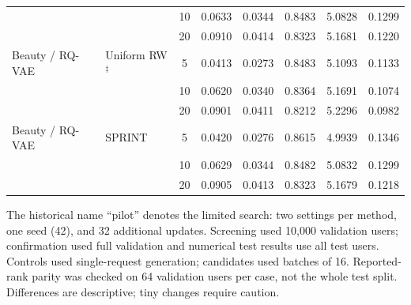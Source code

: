 \begin{table}[p]
\begin{tabular}{llcccccc}
 &  & 10 & 0.0633 & 0.0344 & 0.8483 & 5.0828 & 0.1299 \\
 &  & 20 & 0.0910 & 0.0414 & 0.8323 & 5.1681 & 0.1220 \\
Beauty / RQ-VAE & Uniform RW$^{\ddagger}$ & 5 & 0.0413 & 0.0273 & 0.8483 & 5.1093 & 0.1133 \\
 &  & 10 & 0.0620 & 0.0340 & 0.8364 & 5.1691 & 0.1074 \\
 &  & 20 & 0.0901 & 0.0411 & 0.8212 & 5.2296 & 0.0982 \\
Beauty / RQ-VAE & SPRINT & 5 & 0.0420 & 0.0276 & 0.8615 & 4.9939 & 0.1346 \\
 &  & 10 & 0.0629 & 0.0344 & 0.8482 & 5.0832 & 0.1299 \\
 &  & 20 & 0.0905 & 0.0413 & 0.8323 & 5.1679 & 0.1218 \\
\bottomrule
\end{tabular}
\par\smallskip\footnotesize The historical name ``pilot'' denotes the limited search: two settings per method, one seed (42), and 32 additional updates. Screening used 10,000 validation users; confirmation used full validation and numerical test results use all test users. Controls used single-request generation; candidates used batches of 16. Reported-rank parity was checked on 64 validation users per case, not the whole test split. Differences are descriptive; tiny changes require caution.
\end{table}

